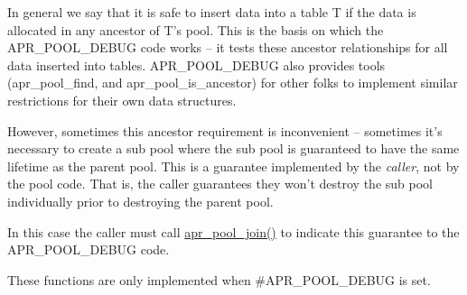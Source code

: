 In general we say that it is safe to insert data into a table T if the data is allocated in any ancestor of T's pool. This is the basis on which the A\-P\-R\-\_\-\-P\-O\-O\-L\-\_\-\-D\-E\-B\-U\-G code works -- it tests these ancestor relationships for all data inserted into tables. A\-P\-R\-\_\-\-P\-O\-O\-L\-\_\-\-D\-E\-B\-U\-G also provides tools (apr\-\_\-pool\-\_\-find, and apr\-\_\-pool\-\_\-is\-\_\-ancestor) for other folks to implement similar restrictions for their own data structures.

However, sometimes this ancestor requirement is inconvenient -- sometimes it's necessary to create a sub pool where the sub pool is guaranteed to have the same lifetime as the parent pool. This is a guarantee implemented by the {\itshape caller}, not by the pool code. That is, the caller guarantees they won't destroy the sub pool individually prior to destroying the parent pool.

In this case the caller must call \hyperlink{group___pool_debug_gaecd956092f81c70117507ad8cbca8ea7}{apr\-\_\-pool\-\_\-join()} to indicate this guarantee to the A\-P\-R\-\_\-\-P\-O\-O\-L\-\_\-\-D\-E\-B\-U\-G code.

These functions are only implemented when \#\-A\-P\-R\-\_\-\-P\-O\-O\-L\-\_\-\-D\-E\-B\-U\-G is set. 

